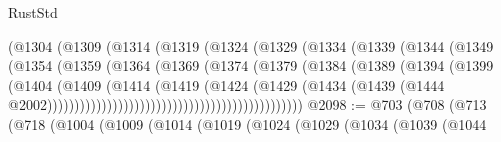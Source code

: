 \begin{lexlean}{RustStd}
\begin{coremodule}
                                        (@1304
                                          (@1309
                                            (@1314
                                              (@1319
                                                (@1324
                                                  (@1329
                                                    (@1334
                                                      (@1339
                                                        (@1344
                                                          (@1349
                                                            (@1354
                                                              (@1359
                                                                (@1364
                                                                  (@1369
                                                                    (@1374
                                                                      (@1379
                                                                        (@1384
                                                                          (@1389
                                                                            (@1394
                                                                              (@1399
                                                                                (@1404
                                                                                  (@1409
                                                                                    (@1414
                                                                                      (@1419
                                                                                        (@1424
                                                                                          (@1429
                                                                                            (@1434
                                                                                              (@1439
                                                                                                (@1444
                                                                                                  @2002)))))))))))))))))))))))))))))))))))))))))))))))
@2098 := @703
    (@708
      (@713
        (@718
          (@1004
            (@1009
              (@1014
                (@1019
                  (@1024
                    (@1029
                      (@1034
                        (@1039
                          (@1044

\end{coremodule}
\end{lexlean}
